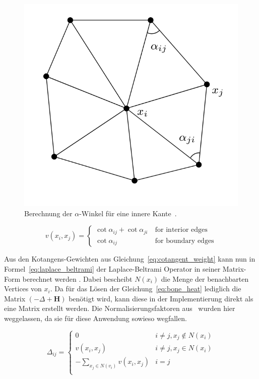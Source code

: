 \begin{figure}[h!]
	\centering
	\includegraphics[width=0.4\linewidth]{resources/img/cotangent_approx.png}
	\caption{Berechnung der $\alpha$-Winkel für eine innere Kante~\cite{laplace_beltrami_paper}.}
	\label{fig:cotangent_approx}
\end{figure}

\begin{equation}
\label{eq:cotangent_weight}
v(x_i,x_j) = 
\begin{cases}
\cot{\alpha_{ij}}+\cot{\alpha_{ji}}\ & \text{for interior edges} \\
\cot{\alpha_{ij}} & \text{for boundary edges}
\end{cases}
\end{equation}

Aus den Kotangens-Gewichten aus Gleichung~\ref{eq:cotangent_weight} kann nun in Formel~\ref{eq:laplace_beltrami} der Laplace-Beltrami Operator in seiner Matrix-Form berechnet werden \cite{spd_solver_paper,laplace_beltrami_paper}. Dabei bescheibt $N(x_i)$ die Menge der benachbarten Vertices von $x_i$. Da für das Lösen der Gleichung~\ref{eq:bone_heat} lediglich die Matrix $(-\Delta+\textbf{H})$ benötigt wird, kann diese in der Implementierung direkt als eine Matrix erstellt werden. Die Normalisierungsfaktoren aus~\cite{spd_solver_paper} wurden hier weggelassen, da sie für diese Anwendung sowieso wegfallen.

\begin{equation}
\label{eq:laplace_beltrami}
\Delta_{ij}=
\begin{cases}
0 & i \neq j, x_j \notin N(x_i) \\
v(x_i,x_j) & i \neq j, x_j \in N(x_i) \\
-\sum_{x_j\in N(v_i)} v(x_i,x_j) & i = j\\
\end{cases}
\end{equation}

